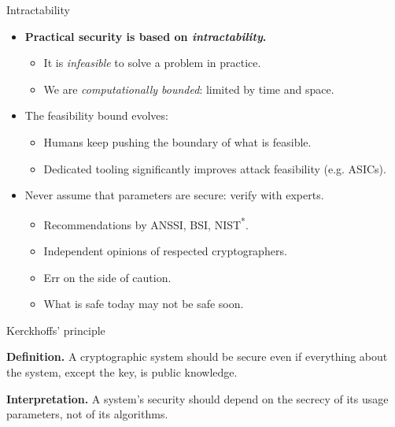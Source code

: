 \begin{frame}{Intractability}
  \begin{itemize}
    \item \textbf{Practical security is based on \emph{intractability}.}
    \begin{itemize}[<+(1)->]
      \item It is \emph{infeasible} to solve a problem in practice.
      \item We are \emph{computationally bounded}: limited by time and space.
    \end{itemize}

    \vspace*{1em}

    \pause
    \item The feasibility bound evolves:
    \begin{itemize}[<+(1)->]
      \item Humans keep pushing the boundary of what is feasible.
      \item Dedicated tooling significantly improves attack feasibility (e.g. ASICs).
    \end{itemize}
    
    \vspace*{1em}

    \pause
    \item Never assume that parameters are secure: verify with experts.
    \begin{itemize}[<+(1)->]
      \item Recommendations by ANSSI, BSI, NIST\textsuperscript{*}.
      \item Independent opinions of respected cryptographers.
      \item Err on the side of caution.
      \item What is safe today may not be safe soon.
    \end{itemize}
  \end{itemize}
\end{frame}

\begin{frame}{Kerckhoffs' principle}

  \pause
  \textbf{Definition.}
  A cryptographic system should be secure even if everything about the system, except the key, is public knowledge.

  \vspace*{1em}

  \pause
  \textbf{Interpretation.}
  A system's security should depend on the secrecy of its usage parameters, not of its algorithms.
\end{frame}

